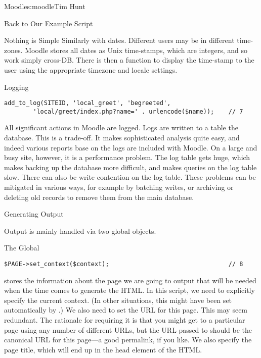 \begin{aosachapter}{Moodle}{s:moodle}{Tim Hunt}
\begin{aosasect1}{Back to Our Example Script}
\begin{aosasect2}{Nothing is Simple}
Similarly with dates. Different users may be in different
time-zones. Moodle stores all dates as Unix time-stamps, which are
integers, and so work simply cross-DB. There is then a 
function to display the time-stamp to the user using the appropriate
timezone and locale settings.

\end{aosasect2}

\begin{aosasect2}{Logging}

\begin{verbatim}
add_to_log(SITEID, 'local_greet', 'begreeted',
        'local/greet/index.php?name=' . urlencode($name));    // 7
\end{verbatim}

All significant actions in Moodle are logged. Logs are written to a
table the database. This is a trade-off. It makes sophisticated
analysis quite easy, and indeed various reports base on the logs are
included with Moodle. On a large and busy site, however, it is a
performance problem. The log table gets huge, which makes backing up
the database more difficult, and makes queries on the log table
slow. There can also be write contention on the log table. These
problems can be mitigated in various ways, for example by batching
writes, or archiving or deleting old records to remove them from the
main database.

\end{aosasect2}

\end{aosasect1}

\begin{aosasect1}{Generating Output}

Output is mainly handled via two global objects.

\begin{aosasect2}{The  Global}

\begin{verbatim}
$PAGE->set_context($context);                                 // 8
\end{verbatim}

 stores the information about the page we are going to
output that will be needed when the time comes to generate the
HTML. In this script, we need to explicitly specify the current
context. (In other situations, this might have been set automatically
by .) We also need to set the URL for this
page. This may seem redundant. The rationale for requiring it is that
you might get to a particular page using any number of different URLs,
but the URL passed to  should be the canonical URL for
this page---a good permalink, if you like. We also specify the page
title, which will end up in the head element of the HTML.


\end{aosasect2}
\end{aosasect1}
\end{aosachapter}
